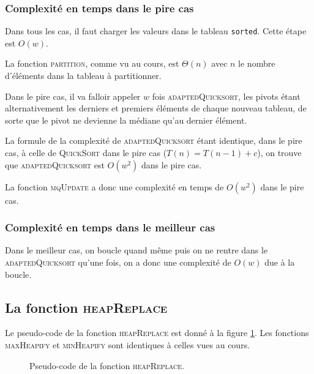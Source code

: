 \documentclass[a4paper, 12pt]{article}
\begin{document}
	\subsubsection{Complexité en temps dans le pire cas}
	Dans tous les cas, il faut charger les valeurs dans le tableau \texttt{sorted}. Cette étape est \(O\left(w\right)\).\par
	La fonction \textsc{partition}, comme vu au cours, est \(\Theta\left(n\right)\) avec \(n\) le nombre d'éléments dans la tableau à partitionner.\par
	Dans le pire cas, il va falloir appeler \(w\) fois \textsc{adaptedQuicksort}, les pivots étant alternativement les derniers et premiers éléments de chaque nouveau tableau, de sorte que le pivot ne devienne la médiane qu'au dernier élément.\par
	La formule de la complexité de \textsc{adaptedQuicksort} étant identique, dans le pire cas, à celle de \textsc{QuickSort} dans le pire cas (\(T\left(n\right) = T\left(n-1\right) + c\)), on trouve que \textsc{adaptedQuicksort} est \(O\left(w^2\right)\) dans le pire cas.\par
	La fonction \textsc{mqUpdate} a donc une complexité en temps de \(O\left(w^2\right)\) dans le pire cas.
	\subsubsection{Complexité en temps dans le meilleur cas}
	Dans le meilleur cas, on boucle quand même puis on ne rentre dans le \textsc{adaptedQuicksort} qu'une fois, on a donc une complexité de \(O\left(w\right)\) due à la boucle.
	\subsection{La fonction \textsc{heapReplace}}
	Le pseudo-code de la fonction \textsc{heapReplace} est donné à la figure \ref{fig:pseudo_code_heap_replace}. Les fonctions \textsc{maxHeapify} et \textsc{minHeapify} sont identiques à celles vues au cours.
	\begin{figure}[!ht]
		\centering
		\setlength{\fboxsep}{3mm}
		\setlength{\fboxrule}{1.5pt}
		\caption{Pseudo-code de la fonction \textsc{heapReplace}.}
		\label{fig:pseudo_code_heap_replace}
	\end{figure}
\end{document}
